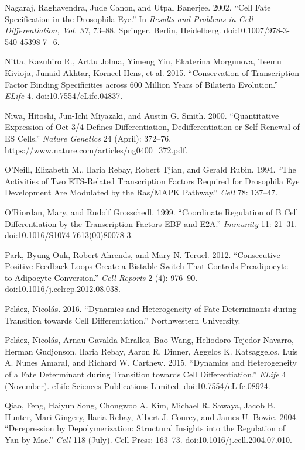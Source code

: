 Nagaraj, Raghavendra, Jude Canon, and Utpal Banerjee. 2002. ``Cell Fate Specification in the Drosophila Eye.'' In \emph{Results and Problems in Cell Differentiation, Vol. 37}, 73--88. Springer, Berlin, Heidelberg. doi:10.1007/978-3-540-45398-7\_6.

Nitta, Kazuhiro R., Arttu Jolma, Yimeng Yin, Ekaterina Morgunova, Teemu Kivioja, Junaid Akhtar, Korneel Hens, et al. 2015. ``Conservation of Transcription Factor Binding Specificities across 600 Million Years of Bilateria Evolution.'' \emph{ELife} 4. doi:10.7554/eLife.04837.

Niwa, Hitoshi, Jun-Ichi Miyazaki, and Austin G. Smith. 2000. ``Quantitative Expression of Oct-3/4 Defines Differentiation, Dedifferentiation or Self-Renewal of ES Cells.'' \emph{Nature Genetics} 24 (April): 372--76. https://www.nature.com/articles/ng0400\_372.pdf.

O'Neill, Elizabeth M., Ilaria Rebay, Robert Tjian, and Gerald Rubin. 1994. ``The Activities of Two ETS-Related Transcription Factors Required for Drosophila Eye Development Are Modulated by the Ras/MAPK Pathway.'' \emph{Cell} 78: 137--47.

O'Riordan, Mary, and Rudolf Grosschedl. 1999. ``Coordinate Regulation of B Cell Differentiation by the Transcription Factors EBF and E2A.'' \emph{Immunity} 11: 21--31. doi:10.1016/S1074-7613(00)80078-3.

Park, Byung Ouk, Robert Ahrends, and Mary N. Teruel. 2012. ``Consecutive Positive Feedback Loops Create a Bistable Switch That Controls Preadipocyte-to-Adipocyte Conversion.'' \emph{Cell Reports} 2 (4): 976--90. doi:10.1016/j.celrep.2012.08.038.

Peláez, Nicolás. 2016. ``Dynamics and Heterogeneity of Fate Determinants during Transition towards Cell Differentiation.'' Northwestern University.

Peláez, Nicolás, Arnau Gavalda-Miralles, Bao Wang, Heliodoro Tejedor Navarro, Herman Gudjonson, Ilaria Rebay, Aaron R. Dinner, Aggelos K. Katsaggelos, Luís A. Nunes Amaral, and Richard W. Carthew. 2015. ``Dynamics and Heterogeneity of a Fate Determinant during Transition towards Cell Differentiation.'' \emph{ELife} 4 (November). eLife Sciences Publications Limited. doi:10.7554/eLife.08924.

Qiao, Feng, Haiyun Song, Chongwoo A. Kim, Michael R. Sawaya, Jacob B. Hunter, Mari Gingery, Ilaria Rebay, Albert J. Courey, and James U. Bowie. 2004. ``Derepression by Depolymerization: Structural Insights into the Regulation of Yan by Mae.'' \emph{Cell} 118 (July). Cell Press: 163--73. doi:10.1016/j.cell.2004.07.010.

